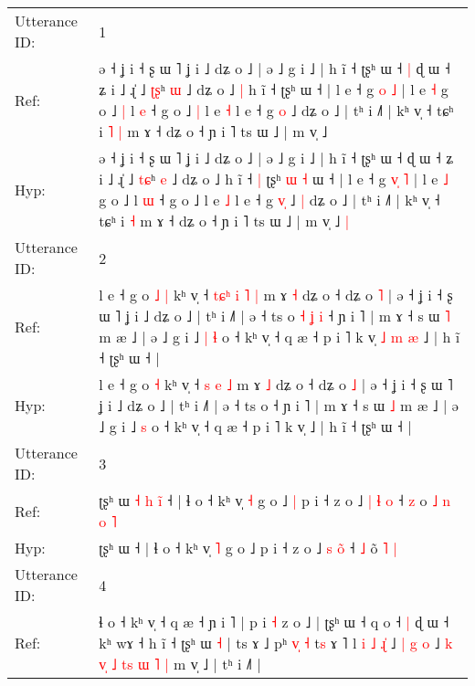 \documentclass[10pt]{article}
\DeclareRobustCommand{\hl}[1]{{\textcolor{red}{#1}}}
\begin{document}
\begin{longtable}{ll}
\toprule
Utterance ID: & 1 \\
Ref: & ə ˧ ʝ i ˧ ʂ ɯ ˥ ʝ i ˩ dʑ o ˩ | ə ˩ g i ˩ | h ĩ ˧ ʈʂʰ ɯ ˧\hl{ }\hl{|} ɖ ɯ ˧ ʑ i ˩ ɻ̍ ˩ \hl{ʈ}\hl{ʂ}ʰ \hl{ɯ} ˩ dʑ o ˩\hl{ }\hl{|} h ĩ ˧\hl{}\hl{} ʈʂʰ\hl{}\hl{}\hl{}\hl{} ɯ ˧ | l e ˧ g \hl{}\hl{o} \hl{˩} | l e \hl{˧} g o ˩\hl{ }\hl{|} l \hl{e} ˧ g o ˩\hl{ }\hl{|} l e \hl{˧} l e ˧ g \hl{}\hl{o} ˩\hl{}\hl{} dʑ o ˩ | tʰ i ˩˥ | kʰ v̩ ˧ tɕʰ i\hl{ }\hl{˥} \hl{|} m ɤ ˧ dʑ o ˧ ɲ i ˥ ts ɯ ˩ | m v̩ ˩\hl{}\hl{}
 \\
Hyp: & ə ˧ ʝ i ˧ ʂ ɯ ˥ ʝ i ˩ dʑ o ˩ | ə ˩ g i ˩ | h ĩ ˧ ʈʂʰ ɯ ˧\hl{}\hl{} ɖ ɯ ˧ ʑ i ˩ ɻ̍ ˩ \hl{t}\hl{ɕ}ʰ \hl{e} ˩ dʑ o ˩\hl{}\hl{} h ĩ ˧\hl{ }\hl{|} ʈʂʰ\hl{ }\hl{ɯ}\hl{ }\hl{˧} ɯ ˧ | l e ˧ g \hl{v}\hl{̩} \hl{˥} | l e \hl{˩} g o ˩\hl{}\hl{} l \hl{ɯ} ˧ g o ˩\hl{}\hl{} l e \hl{˩} l e ˧ g \hl{v}\hl{̩} ˩\hl{ }\hl{|} dʑ o ˩ | tʰ i ˩˥ | kʰ v̩ ˧ tɕʰ i\hl{}\hl{} \hl{˧} m ɤ ˧ dʑ o ˧ ɲ i ˥ ts ɯ ˩ | m v̩ ˩\hl{ }\hl{|}
 \\
\midrule
Utterance ID: & 2 \\
Ref: & l e ˧ g o\hl{ }\hl{˩} \hl{|} kʰ v̩ ˧\hl{ }\hl{t}\hl{ɕ}\hl{ʰ} \hl{i} \hl{˥} \hl{|} m ɤ \hl{˧} dʑ o ˧ dʑ o \hl{˥} | ə ˧ ʝ i ˧ ʂ ɯ ˥ ʝ i ˩ dʑ o ˩ | tʰ i ˩˥ | ə ˧ ts o\hl{ }\hl{˧}\hl{ }\hl{ʝ}\hl{ }\hl{i} ˧ ɲ i ˥ | m ɤ ˧ s ɯ \hl{˥} m æ ˩ | ə ˩ g i ˩\hl{ }\hl{|} \hl{ɬ} o ˧ kʰ v̩ ˧ q æ ˧ p i ˥ k v̩\hl{ }\hl{˩}\hl{ }\hl{m}\hl{ }\hl{æ} ˩ | h ĩ ˧ ʈʂʰ ɯ ˧ |
 \\
Hyp: & l e ˧ g o\hl{}\hl{} \hl{˧} kʰ v̩ ˧\hl{}\hl{}\hl{}\hl{} \hl{s} \hl{e} \hl{˩} m ɤ \hl{˩} dʑ o ˧ dʑ o \hl{˩} | ə ˧ ʝ i ˧ ʂ ɯ ˥ ʝ i ˩ dʑ o ˩ | tʰ i ˩˥ | ə ˧ ts o\hl{}\hl{}\hl{}\hl{}\hl{}\hl{} ˧ ɲ i ˥ | m ɤ ˧ s ɯ \hl{˩} m æ ˩ | ə ˩ g i ˩\hl{}\hl{} \hl{s} o ˧ kʰ v̩ ˧ q æ ˧ p i ˥ k v̩\hl{}\hl{}\hl{}\hl{}\hl{}\hl{} ˩ | h ĩ ˧ ʈʂʰ ɯ ˧ |
 \\
\midrule
Utterance ID: & 3 \\
Ref: & ʈʂʰ ɯ\hl{ }\hl{˧}\hl{ }\hl{h}\hl{ }\hl{i}\hl{̃} ˧ | ɬ o ˧ kʰ v̩ \hl{˧} g o ˩\hl{ }\hl{|} p i ˧ z o ˩ \hl{|} \hl{ɬ}\hl{ }\hl{o} ˧ \hl{z} o\hl{ }\hl{˩}\hl{ }\hl{n} \hl{o} \hl{˥}
 \\
Hyp: & ʈʂʰ ɯ\hl{}\hl{}\hl{}\hl{}\hl{}\hl{}\hl{} ˧ | ɬ o ˧ kʰ v̩ \hl{˥} g o ˩\hl{}\hl{} p i ˧ z o ˩ \hl{s} \hl{}\hl{o}\hl{̃} ˧ \hl{˩} o\hl{}\hl{}\hl{}\hl{̃} \hl{˥} \hl{|}
 \\
\midrule
Utterance ID: & 4 \\
Ref: & ɬ o ˧ kʰ v̩ ˧ q æ ˧ ɲ i ˥ | p i \hl{˧} z o ˩ | ʈʂʰ ɯ ˧ q o ˧\hl{ }\hl{|} ɖ ɯ ˧ kʰ wɤ ˧ h ĩ ˧ ʈʂʰ ɯ \hl{˧} | ts ɤ ˩ pʰ \hl{v}\hl{̩} \hl{˧} t\hl{s} ɤ ˥ l \hl{i} \hl{˩} \hl{}\hl{ɻ}\hl{̍} ˩ \hl{|} \hl{g}\hl{ }\hl{o} ˩ \hl{k} \hl{v}\hl{̩} \hl{˩} \hl{t}\hl{s}\hl{ }\hl{ɯ} \hl{˥} \hl{|} m v̩ ˩ | tʰ i ˩˥ |

\end{longtable}
\end{document}
